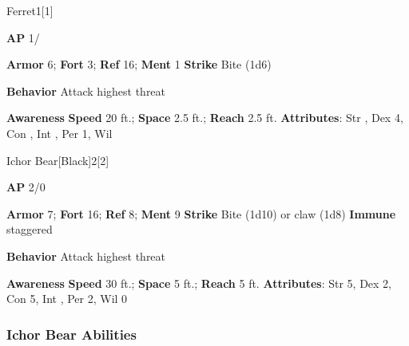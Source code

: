 \begin{monsection}{Ferret}{1}[1]
\vspace{-1em}\vspace{-1em}
\begin{spellcontent}
\begin{spelltargetinginfo}
{\textbf{AP} 1/}

\pari \textbf{Armor} 6;
\textbf{Fort} 3;
\textbf{Ref} 16;
\textbf{Ment} 1
\pari \textbf{Strike} Bite  (1d6)



\pari \textbf{Behavior} Attack highest threat
\end{spelltargetinginfo}
\end{spellcontent}

\begin{monsterfooter}
\pari \textbf{Awareness} 
\pari \textbf{Speed} 20 ft.;
\textbf{Space} 2.5 ft.;
\textbf{Reach} 2.5 ft.
\pari \textbf{Attributes}:
Str ,
Dex 4,
Con ,
Int ,
Per 1,
Wil 
\end{monsterfooter}
\end{monsection}

\begin{monsection}{Ichor Bear}[Black]{2}[2]
\vspace{-1em}\vspace{-1em}
\begin{spellcontent}
\begin{spelltargetinginfo}
{\textbf{AP} 2/0}

\pari \textbf{Armor} 7;
\textbf{Fort} 16;
\textbf{Ref} 8;
\textbf{Ment} 9
\pari \textbf{Strike} Bite  (1d10) or claw  (1d8)
\pari \textbf{Immune} staggered


\pari \textbf{Behavior} Attack highest threat
\end{spelltargetinginfo}
\end{spellcontent}

\begin{monsterfooter}
\pari \textbf{Awareness} 
\pari \textbf{Speed} 30 ft.;
\textbf{Space} 5 ft.;
\textbf{Reach} 5 ft.
\pari \textbf{Attributes}:
Str 5,
Dex 2,
Con 5,
Int ,
Per 2,
Wil 0
\end{monsterfooter}
\end{monsection}


\subsubsection{Ichor Bear Abilities}

